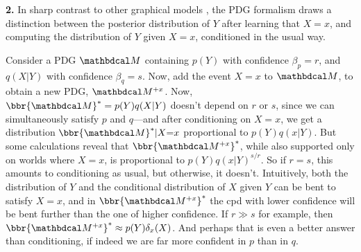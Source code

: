 \documentclass[twoside]{article}
\begin{document}
\textbf{2.}
In sharp contrast to other graphical models \parencite[pg 26]{koller2009probabilistic}, 
the PDG formalism draws a distinction between
the posterior distribution of $Y$ after learning that $X{=}x$,
and computing the distribution of $Y$ given $X{=}x$, conditioned in the usual way. 

\begin{example}
	Consider a PDG $\dg M$ containing $p(Y)$ with confidence
    $\beta_p = r$, and $q(X|Y)$ with confidence $\beta_q = s$.
    Now, add the event $X{=}x$ to $\dg M$, to obtain
    a new PDG, $\dg M^{+x}$.
	Now, $\bbr{\dg M}^* = p(Y)q(X|Y)$ doesn't depend on $r$ or $s$, since we can simultaneously satisfy $p$ and $q$---and after conditioning on $X{=}x$, we get a distribution $\bbr{\dg M}^* | X{=}x$ proportional to $p(Y) q(x|Y)$.
	But some calculations reveal that $\bbr{\dg M^{+x}}^*$,
    while also supported only on worlds where $X{=}x$, is proportional to
	$p(Y) q(x|Y)^{s/r}$.
	So if $r = s$,
    this amounts to conditioning as usual, but otherwise,
    it doesn't.
    Intuitively, both the distribution of $Y$ and the conditional distribution of $X$ given $Y$ can be bent to satisfy $X{=}x$, and in $\bbr{\dg M^{+x}}^*$ the cpd with lower confidence will be bent further than the one of higher confidence.
    If $r \gg s$ for example,
    then $\bbr{\dg M^{+x}}^* \approx
    p(Y) \delta_x(X)$.
    And perhaps that is even a better answer than conditioning, if indeed we are far more confident in $p$ than in $q$.
\end{example}
\end{document}
